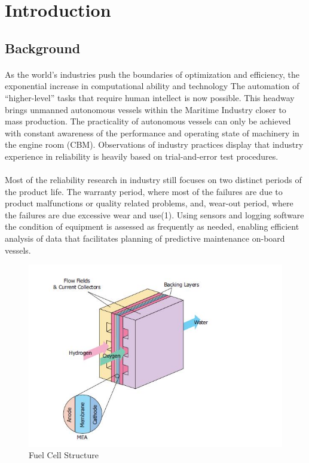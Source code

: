 \section{Introduction}
\label{sec:introduction}
\subsection{Background}
\paragraph{}As the world’s industries push the boundaries of optimization and efficiency, the exponential increase in computational ability and technology The automation of “higher-level” tasks that require human intellect is now possible. This headway brings unmanned autonomous vessels within the Maritime Industry closer to mass production. The practicality of autonomous vessels can only be achieved with constant awareness of the performance and operating state of machinery in the engine room (CBM).  Observations of industry practices display that industry experience in reliability is heavily based on trial-and-error test procedures. 

\paragraph{}Most of the reliability research in industry still focuses on two distinct periods of the product life. The warranty period, where most of the failures are due to product malfunctions or quality related problems, and, wear-out period, where the failures are due excessive wear and use(1). Using sensors and logging software the condition of equipment is assessed as  frequently as needed, enabling efficient analysis of data that facilitates planning of predictive maintenance on-board vessels. 

\begin{figure}
\includegraphics{Figures/Figure3}
\caption{Fuel Cell Structure
\cite{pukrushpan_modeling_2003}}
\end{figure}


